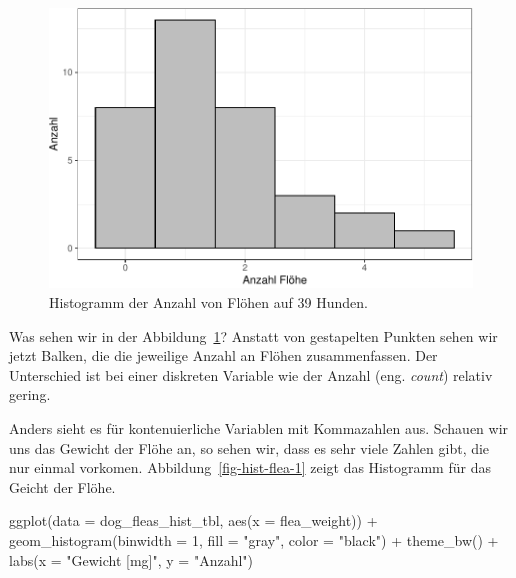 \documentclass[
  letterpaper,
]{scrbook}
\newenvironment{Shaded}{\begin{snugshade}}{\end{snugshade}}
\newcommand{\AttributeTok}[1]{\textcolor[rgb]{0.40,0.45,0.13}{#1}}
\newcommand{\DecValTok}[1]{\textcolor[rgb]{0.68,0.00,0.00}{#1}}
\newcommand{\FunctionTok}[1]{\textcolor[rgb]{0.28,0.35,0.67}{#1}}
\newcommand{\NormalTok}[1]{\textcolor[rgb]{0.00,0.23,0.31}{#1}}
\newcommand{\SpecialCharTok}[1]{\textcolor[rgb]{0.37,0.37,0.37}{#1}}
\newcommand{\StringTok}[1]{\textcolor[rgb]{0.13,0.47,0.30}{#1}}
\begin{document}
\begin{figure}[H]

{\centering \includegraphics{./eda-ggplot_files/figure-pdf/fig-hist-flea-count-1.pdf}

}

\caption{\label{fig-hist-flea-count}Histogramm der Anzahl von Flöhen auf
39 Hunden.}

\end{figure}

Was sehen wir in der Abbildung~\ref{fig-hist-flea-count}? Anstatt von
gestapelten Punkten sehen wir jetzt Balken, die die jeweilige Anzahl an
Flöhen zusammenfassen. Der Unterschied ist bei einer diskreten Variable
wie der Anzahl (eng. \emph{count}) relativ gering.

Anders sieht es für kontenuierliche Variablen mit Kommazahlen aus.
Schauen wir uns das Gewicht der Flöhe an, so sehen wir, dass es sehr
viele Zahlen gibt, die nur einmal vorkomen.
Abbildung~\ref{fig-hist-flea-1} zeigt das Histogramm für das Geicht der
Flöhe.

\begin{Shaded}
\begin{Highlighting}[]
\FunctionTok{ggplot}\NormalTok{(}\AttributeTok{data =}\NormalTok{ dog\_fleas\_hist\_tbl, }\FunctionTok{aes}\NormalTok{(}\AttributeTok{x =}\NormalTok{ flea\_weight)) }\SpecialCharTok{+}
  \FunctionTok{geom\_histogram}\NormalTok{(}\AttributeTok{binwidth =} \DecValTok{1}\NormalTok{, }\AttributeTok{fill =} \StringTok{"gray"}\NormalTok{, }\AttributeTok{color =} \StringTok{"black"}\NormalTok{) }\SpecialCharTok{+}
  \FunctionTok{theme\_bw}\NormalTok{() }\SpecialCharTok{+}
  \FunctionTok{labs}\NormalTok{(}\AttributeTok{x =} \StringTok{"Gewicht [mg]"}\NormalTok{, }\AttributeTok{y =} \StringTok{"Anzahl"}\NormalTok{) }
\end{Highlighting}
\end{Shaded}
\end{document}
